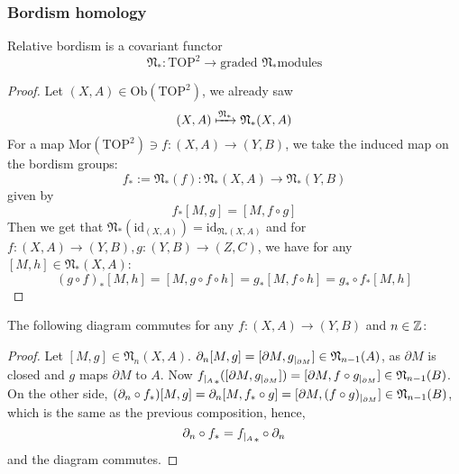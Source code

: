 \documentclass[a4paper,11pt]{article}
\begin{document}
\subsubsection{Bordism homology}

\begin{lemma}\cite[II, Satz 3.2]{brocker}\label{functoriality}
    Relative bordism is a covariant functor \[\mathfrak{N}_\ast:\mathrm{TOP}^2\to\text{graded \(\mathfrak{N}_\ast\)modules}\]
\end{lemma}

\begin{proof}\cite{brocker} 
    Let \((X,A)\in\mathrm{Ob}(\mathrm{TOP}^2)\), we already saw
    \[(X,A)\xmapsto{\mathfrak{N}_\ast}\mathfrak{N}_\ast(X,A)\]
    For a map \(\mathrm{Mor}(\mathrm{TOP}^2)\ni f:(X,A)\to(Y,B)\), we take the induced map on the bordism groups:
    \[f_\ast:=\mathfrak{N}_\ast(f):\mathfrak{N}_\ast(X,A)\to\mathfrak{N}_\ast(Y,B)\]
    given by 
    \[f_\ast[M,g] = [M,f\circ g]\]
    Then we get that \(\mathfrak{N}_\ast(\mathrm{id}_{(X,A)})=\mathrm{id}_{\mathfrak{N}_\ast(X,A)}\) and for \(f:(X,A)\to(Y,B), g:(Y,B)\to(Z,C)\), we have for any \([M,h]\in\mathfrak{N}_\ast(X,A)\):
    \[{(g\circ f)}_{\ast}[M,h]=[M,g\circ f\circ h]=g_\ast[M,f\circ h]=g_\ast\circ f_\ast[M,h]\]
\end{proof}

\begin{lemma}\label{naturality}
    The following diagram commutes for any \(f:(X,A)\to(Y,B)\) and \(n\in\mathbb{Z}\): %
    \begin{center}
    \end{center}
\end{lemma}

\begin{proof}
    Let \([M,g]\in\mathfrak{N}_n(X,A)\). \(\partial_n[M,g]=[\partial M, g_{|_{\partial M}}]\in\mathfrak{N}_{n-1}(A)\), as \(\partial M\) is closed and \(g\) maps \(\partial M\) to \(A\). %
    Now \({f_{|_{A}}}_\ast([\partial M,g_{|_{\partial M}}])=[\partial M,f\circ g_{|_{\partial M}}]\in \mathfrak{N}_{n-1}(B)\).\\
    On the other side, \((\partial_n\circ f_\ast)[M,g]=\partial_n [M,f_\ast\circ g]=[\partial M,(f\circ g)_{|_{\partial M}}]\in \mathfrak{N}_{n-1}(B)\), which is the same as the previous composition, hence,
    \[\partial_n\circ f_\ast={f_{|_{A}}}_\ast\circ \partial_n\]
    and the diagram commutes.
\end{proof}
\end{document}

